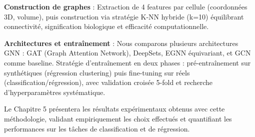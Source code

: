 \textbf{Construction de graphes} : Extraction de 4 features par cellule (coordonnées 3D, volume), puis construction via stratégie K-NN hybride (k=10) équilibrant connectivité, signification biologique et efficacité computationnelle.

\textbf{Architectures et entraînement} : Nous comparons plusieurs architectures GNN : GAT (Graph Attention Network), DeepSets, EGNN équivariant, et GCN comme baseline. Stratégie d'entraînement en deux phases : pré-entraînement sur synthétiques (régression clustering) puis fine-tuning sur réels (classification/régression), avec validation croisée 5-fold et recherche d'hyperparamètres systématique.

Le Chapitre 5 présentera les résultats expérimentaux obtenus avec cette méthodologie, validant empiriquement les choix effectués et quantifiant les performances sur les tâches de classification et de régression.
